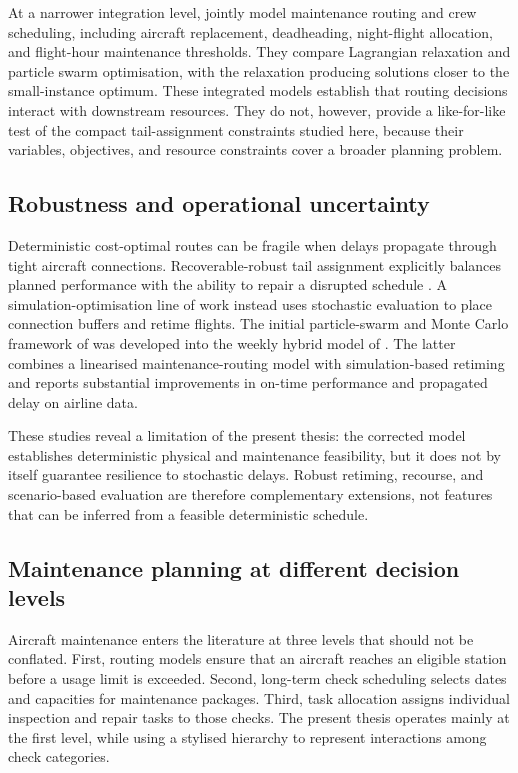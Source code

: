 At a narrower integration level, \citet{mirjafari2020integrated} jointly model
maintenance routing and crew scheduling, including aircraft replacement,
deadheading, night-flight allocation, and flight-hour maintenance thresholds.
They compare Lagrangian relaxation and particle swarm optimisation, with the
relaxation producing solutions closer to the small-instance optimum. These
integrated models establish that routing decisions interact with downstream
resources. They do not, however, provide a like-for-like test of the compact
tail-assignment constraints studied here, because their variables, objectives,
and resource constraints cover a broader planning problem.

\subsection{Robustness and operational uncertainty}

Deterministic cost-optimal routes can be fragile when delays propagate through
tight aircraft connections. Recoverable-robust tail assignment explicitly
balances planned performance with the ability to repair a disrupted schedule
\citep{froyland2013recoverable}. A simulation-optimisation line of work instead
uses stochastic evaluation to place connection buffers and retime flights. The
initial particle-swarm and Monte Carlo framework of
\citet{benahmed2015simulation} was developed into the weekly hybrid model of
\citet{benahmed2017hybrid}. The latter combines a linearised maintenance-routing
model with simulation-based retiming and reports substantial improvements in
on-time performance and propagated delay on airline data.

These studies reveal a limitation of the present thesis: the corrected model
establishes deterministic physical and maintenance feasibility, but it does not
by itself guarantee resilience to stochastic delays. Robust retiming, recourse,
and scenario-based evaluation are therefore complementary extensions, not
features that can be inferred from a feasible deterministic schedule.

\subsection{Maintenance planning at different decision levels}

Aircraft maintenance enters the literature at three levels that should not be
conflated. First, routing models ensure that an aircraft reaches an eligible
station before a usage limit is exceeded. Second, long-term check scheduling
selects dates and capacities for maintenance packages. Third, task allocation
assigns individual inspection and repair tasks to those checks. The present
thesis operates mainly at the first level, while using a stylised hierarchy to
represent interactions among check categories.

